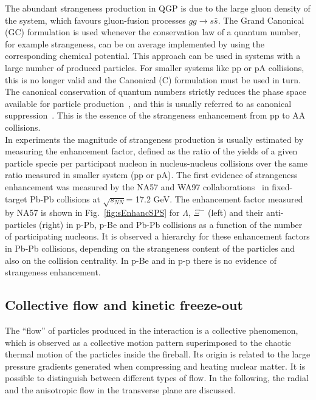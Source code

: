 The abundant strangeness production in QGP is due to the large gluon 
density of the system, which favours gluon-fusion processes
$gg \rightarrow s\bar{s}$. 
The Grand Canonical (GC) formulation is used whenever the conservation law of
a quantum number, for example strangeness, can be on average implemented by using
the corresponding chemical potential. This approach can be used in systems 
with a large number of produced particles. For smaller systems like pp or pA
collisions, this is no longer valid and the Canonical (C) formulation must be used
in turn. The canonical conservation of quantum numbers strictly reduces the phase
space available for particle production~\cite{Beutler:2009cc}, and this is usually referred to as canonical suppression~\cite{Tounsi:2001ck}.
This is the essence of the strangeness enhancement from pp to AA collisions.\\
In experiments the magnitude of strangeness production is usually estimated by measuring 
the enhancement factor, defined as the ratio of the yields of a given particle 
specie per participant nucleon in nucleus-nucleus collisions over the same 
ratio measured in smaller system (pp or pA). The first evidence of 
strangeness enhancement was measured by the NA57 and WA97 
collaborations~\cite{Sandor:2004bg} in fixed-target Pb-Pb collisions at 
$\sqrt{s_{NN}}$= 17.2 GeV. The enhancement factor measured by NA57 
is shown in Fig.~\ref{fig:sEnhancSPS} for $\Lambda$, $\Xi^-$ (left) and 
their anti-particles (right) in p-Pb, p-Be and Pb-Pb collisions as a function 
of the number of participating nucleons. It is observed a hierarchy for these 
enhancement factors in Pb-Pb collisions, depending on the strangeness
 content of the particles and also on the collision centrality. In p-Be and in 
 p-p there is no evidence of strangeness enhancement. 

\subsection{Collective flow and kinetic freeze-out}
\label{sec:FlowIntro}
The ``flow'' of particles produced in the interaction is a collective phenomenon, which is observed as a collective 
motion pattern superimposed to the chaotic thermal motion of the 
particles inside the fireball. Its origin is related to the large pressure gradients 
generated when compressing and heating nuclear matter. It is possible 
to distinguish between different types of flow. In the following, 
the radial and the anisotropic flow in the transverse plane are discussed. 

